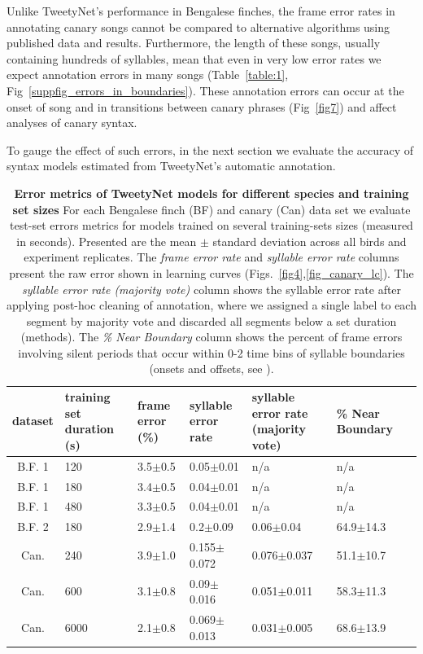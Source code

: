 \documentclass[10pt,letterpaper]{article}
\begin{document}
Unlike TweetyNet's performance in Bengalese finches, the frame error rates in annotating canary songs cannot be compared to alternative algorithms using published data and results. Furthermore, the length of these songs, usually containing hundreds of syllables, mean that even in very low error rates we expect annotation errors in many songs (Table~\ref{table:1}, Fig~\ref{suppfig_errors_in_boundaries}). These annotation errors can occur at the onset of song and in transitions between canary phrases (Fig~\ref{fig7}) and affect analyses of canary syntax. 

To gauge the effect of such errors, in the next section we evaluate the accuracy of syntax models estimated from TweetyNet's automatic annotation. 
\begin{table}[h!]
\centering
\begin{tabular}{ | c || m{5em} | m{5em} | m{5em} | m{5em} | m{5em} || m{5em} |  }
 \hline
 dataset & training set duration (s) & frame error (\%) & syllable error rate & syllable error rate (majority vote) & \% Near Boundary \\
 \hline
B.F. 1            & 120 & 3.5$\pm$0.5 & 0.05$\pm$0.01 & n/a & n/a\\
\hline
B.F. 1            & 180 & 3.4$\pm$0.5 & 0.04$\pm$0.01 & n/a & n/a\\
\hline
B.F. 1            & 480 & 3.3$\pm$0.5 & 0.04$\pm$0.01 & n/a & n/a\\
\hline
B.F. 2 & 180 & 2.9$\pm$1.4 & 0.2$\pm$0.09 & 0.06$\pm$0.04 & 64.9$\pm$14.3\\
\hline
Can. & 240 & 3.9$\pm$1.0 & 0.155$\pm$0.072 & 0.076$\pm$0.037 & 51.1$\pm$10.7\\
\hline
Can. & 600 & 3.1$\pm$0.8 & 0.09$\pm$0.016 & 0.051$\pm$0.011 & 58.3$\pm$11.3\\
\hline
Can. & 6000 & 2.1$\pm$0.8 & 0.069$\pm$0.013 & 0.031$\pm$0.005 & 68.6$\pm$13.9\\
 \hline
\end{tabular}
\caption{{\bf Error metrics of TweetyNet models for different species and training set sizes}
For each Bengalese finch (BF) and canary (Can) data set we evaluate test-set errors metrics for models trained on several training-sets sizes (measured in seconds). Presented are the mean $\pm$ standard deviation across all birds and experiment replicates. The \textit{frame error rate}  and \textit{syllable error rate} columns present the raw error shown in learning curves (Figs.~\ref{fig4},\ref{fig_canary_lc}). The \textit{syllable error rate (majority vote)} column shows the syllable error rate after applying post-hoc cleaning of annotation, where we assigned a single label to each segment by majority vote and discarded all segments below a set duration (methods). The \textit{\% Near Boundary} column shows the percent of frame errors involving silent periods that occur within 0-2 time bins of syllable boundaries (onsets and offsets, see ).}

\end{table}
\end{document}
